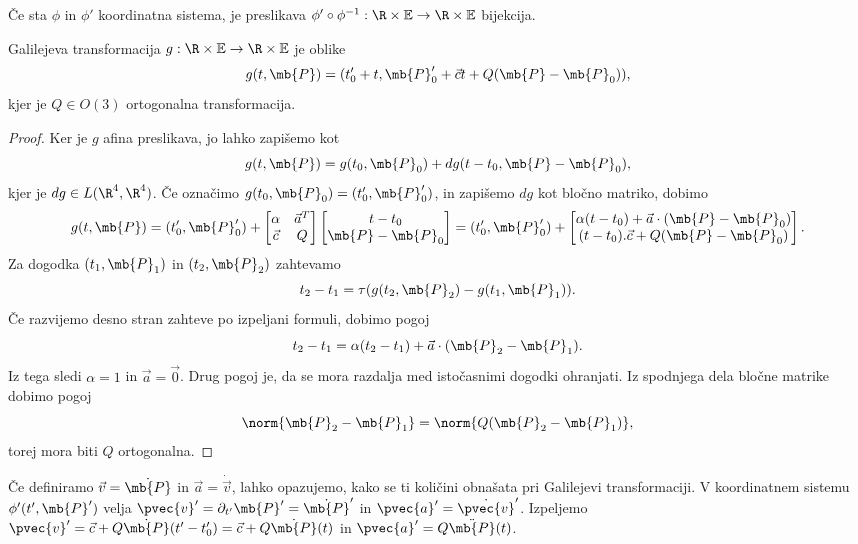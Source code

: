 \begin{opomba}
  Če sta $\phi$ in $\phi'$ koordinatna sistema, je preslikava $\phi' \circ
  \phi^{-1}: \galileo \to \galileo$ bijekcija.
\end{opomba}


\begin{izrek}
  Galilejeva transformacija $g: \galileo \to \galileo$ je oblike
  \[
    g(t, \mb{P}) = (t_0' + t, \mb{P}_0' + \vec{c} t + Q(\mb{P} -
    \mb{P}_0)),
  \]
  kjer je $Q \in O(3)$ ortogonalna transformacija.
\end{izrek}

\begin{proof}
  Ker je $g$ afina preslikava, jo lahko zapišemo kot
  \[
    g(t, \mb{P}) = g(t_0, \mb{P}_0) + dg(t - t_0, \mb{P} - \mb{P}_0),
  \]
  kjer je $dg \in L(\R^4, \R^4)$.
  Če označimo $g(t_0, \mb{P}_0) = (t_0', \mb{P}_0')$, in zapišemo $dg$ kot
  bločno matriko, dobimo
  \[
    g(t, \mb{P})
    =
    (t_0', \mb{P}_0')
    +
    \begin{bmatrix}
      \alpha & \vec{a}^T \\
      \vec{c} & Q
    \end{bmatrix}
    \begin{bmatrix}
      t - t_0 \\ \mb{P} - \mb{P}_0
    \end{bmatrix}
    =
    (t_0', \mb{P}_0')
    +
    \begin{bmatrix}
      \alpha (t - t_0) + \vec{a} \cdot (\mb{P} - \mb{P}_0) \\
      (t - t_0).\vec{c} + Q (\mb{P} - \mb{P}_0)
    \end{bmatrix}.
  \]
  Za dogodka $(t_1, \mb{P}_1)$ in $(t_2, \mb{P}_2)$ zahtevamo
  \[
    t_2 - t_1 = \tau(g(t_2, \mb{P}_2) - g(t_1, \mb{P}_1)).
  \]
  Če razvijemo desno stran zahteve po izpeljani formuli, dobimo pogoj
  \[
    t_2 - t_1 = \alpha (t_2 - t_1) + \vec{a} \cdot (\mb{P}_2 - \mb{P}_1).
  \]
  Iz tega sledi $\alpha = 1$ in $\vec{a} = \vec{0}$.
  Drug pogoj je, da se mora razdalja med istočasnimi dogodki ohranjati.
  Iz spodnjega dela bločne matrike dobimo pogoj
  \[
    \norm{\mb{P}_2 - \mb{P}_1} = \norm{ Q (\mb{P}_2 - \mb{P}_1)},
  \]
  torej mora biti $Q$ ortogonalna.
\end{proof}


Če definiramo $\vec{v} = \dot{\mb{P}}$ in $\vec{a} = \dot{\vec{v}}$, lahko
opazujemo, kako se ti količini obnašata pri Galilejevi transformaciji.
V koordinatnem sistemu $\phi'(t', \mb{P}')$ velja $\pvec{v}' = \partial_{t'}
\mb{P}' = \dot{\mb{P}}'$ in $\pvec{a}' = \dot{\pvec{v}}'$.
Izpeljemo $\pvec{v}' = \vec{c} + Q \dot{\mb{P}}(t' - t_0') = \vec{c} + Q
\dot{\mb{P}}(t)$ in $\pvec{a}' = Q \ddot{\mb{P}}(t)$.


